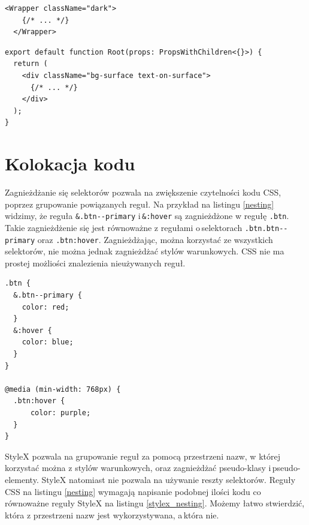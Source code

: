 \documentclass[a4paper,12pt]{book} %
\begin{document}
\begin{lstfloat}[hb]
  \lstset{language=HTML}
  \begin{lstlisting}[frame=single]
  <Wrapper className="dark">
    {/* ... */}
  </Wrapper>
\end{lstlisting}
  \caption{Tailwind CSS nałożenie motywu}\label{tailwind_theme}
\end{lstfloat}

\begin{lstfloat}[hb]
  \lstset{language=HTML}
  \begin{lstlisting}[frame=single]
export default function Root(props: PropsWithChildren<{}>) {
  return (
    <div className="bg-surface text-on-surface">
      {/* ... */}
    </div>
  );
}
\end{lstlisting}
  \caption{Tailwind CSS użycie zmiennych }\label{tailwind_vars}
\end{lstfloat}



\clearpage 
\section{Kolokacja kodu}
Zagnieżdżanie się selektorów pozwala na zwiększenie czytelności kodu CSS, poprzez grupowanie powiązanych reguł. Na przykład na listingu \ref{nesting} widzimy, że reguła \lstinline|&.btn--primary| i\,\lstinline|&:hover| są zagnieżdżone w regułę \lstinline|.btn|. Takie zagnieżdżenie się jest równoważne z regułami o\,selektorach \lstinline|.btn.btn--primary| oraz \lstinline|.btn:hover|. Zagnieżdżając, można korzystać ze wszystkich selektorów, nie można jednak zagnieżdżać stylów warunkowych. CSS nie ma prostej możliości znalezienia nieużywanych reguł.

\begin{lstfloat}[hb]
  \lstset{language=HTML}
  \begin{lstlisting}[frame=single]
.btn {
  &.btn--primary {
    color: red;
  }
  &:hover {
    color: blue;
  }
}

@media (min-width: 768px) {
  .btn:hover {
      color: purple;
  }
}
\end{lstlisting}
  \caption{Zagnieżdżanie się reguł w CSS}\label{nesting}
\end{lstfloat}


StyleX pozwala na grupowanie reguł za pomocą przestrzeni nazw, w której korzystać można z stylów warunkowych, oraz zagnieżdżać pseudo-klasy i\,pseudo-elementy. StyleX natomiast nie pozwala na używanie reszty selektorów. Reguły CSS na listingu \ref{nesting} wymagają napisanie podobnej ilości kodu co równoważne reguły StyleX na listingu \ref{stylex_nesting}. Możemy łatwo stwierdzić, która z przestrzeni nazw jest wykorzystywana, a\,która nie.
\end{document}
